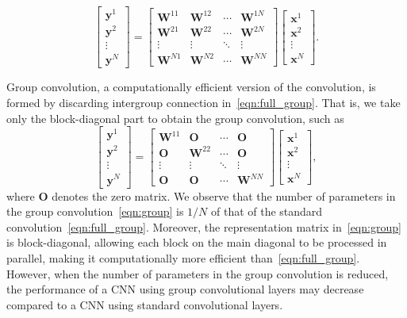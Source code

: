 \documentclass[10pt,a4paper]{amsart}
\numberwithin{equation}{section}
\theoremstyle{remark}
\newcommand\bO{\mathbf{O}}
\newcommand\bW{\mathbf{W}}
\newcommand\bx{\mathbf{x}}
\newcommand\by{\mathbf{y}}
\begin{document}
\begin{equation}
\label{eqn:full_group}
    \begin{bmatrix} \by^1 \\ \by^2 \\ \vdots \\ \by^N \end{bmatrix}
    = \begin{bmatrix} \bW^{11} & \bW^{12} & \cdots & \bW^{1N} \\
        \bW^{21} & \bW^{22} & \cdots & \bW^{2N} \\
        \vdots & \vdots & \ddots & \vdots \\
        \bW^{N1} & \bW^{N2} & \cdots & \bW^{NN} \end{bmatrix}
    \begin{bmatrix} \bx^1 \\ \bx^2 \\ \vdots \\ \bx^N \end{bmatrix}.
\end{equation}

Group convolution, a computationally efficient version of the convolution, is formed by discarding intergroup connection in~\eqref{eqn:full_group}.
That is, we take only the block-diagonal part to obtain the group convolution, such as
\begin{equation}
\label{eqn:group}
    \begin{bmatrix} \by^1 \\ \by^2 \\ \vdots \\ \by^N \end{bmatrix}
    = \begin{bmatrix} \bW^{11} & \bO & \cdots & \bO \\
        \bO & \bW^{22} & \cdots & \bO \\
        \vdots & \vdots & \ddots & \vdots \\
        \bO & \bO & \cdots & \bW^{NN} \end{bmatrix}
    \begin{bmatrix} \bx^1 \\ \bx^2 \\ \vdots \\ \bx^N \end{bmatrix},
\end{equation}
where $\bO$ denotes the zero matrix.
We observe that the number of parameters in the group convolution~\eqref{eqn:group} is $1/N$ of that of the standard convolution~\eqref{eqn:full_group}.
Moreover, the representation matrix in~\eqref{eqn:group} is block-diagonal, allowing each block on the main diagonal to be processed in parallel, making it computationally more efficient than~\eqref{eqn:full_group}. 
However, when the number of parameters in the group convolution is reduced, the performance of a CNN using group convolutional layers may decrease compared to a CNN using standard convolutional layers.
\end{document}

